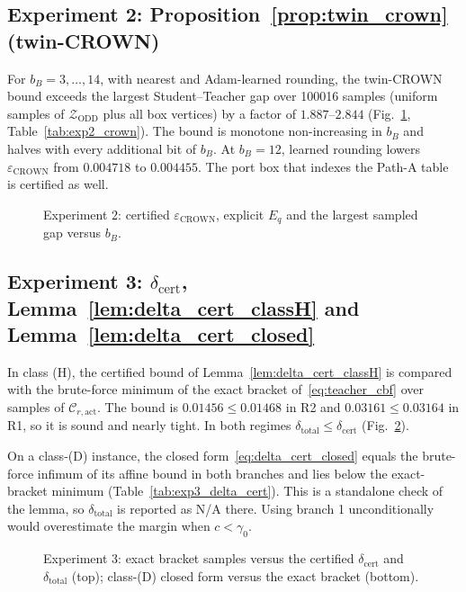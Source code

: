 \subsection{Experiment 2: Proposition~\ref{prop:twin_crown} (twin-CROWN)}
For \(b_B = 3,\dots,14\), with nearest and Adam-learned rounding, the twin-CROWN bound exceeds the
largest Student--Teacher gap over 100016 samples (uniform samples of \(\mathcal Z_{\mathrm{ODD}}\) plus all box
vertices) by a factor of \(1.887\)--\(2.844\) (Fig.~\ref{fig:exp2}, Table~\ref{tab:exp2_crown}).
The bound is monotone non-increasing in \(b_B\) and halves with every additional bit of \(b_B\). At \(b_B = 12\), learned rounding
lowers \(\varepsilon_{\mathrm{CROWN}}\) from \(0.004718\) to \(0.004455\). The port box that indexes the Path-A
table is certified as well.


\begin{figure}[t]\centering{}
\caption{Experiment 2: certified \(\varepsilon_{\mathrm{CROWN}}\), explicit \(E_q\) and the largest sampled gap versus \(b_B\).}\label{fig:exp2}\end{figure}

\subsection{Experiment 3: \(\delta_{\mathrm{cert}}\), Lemma~\ref{lem:delta_cert_classH} and Lemma~\ref{lem:delta_cert_closed}}
In class (H), the certified bound of Lemma~\ref{lem:delta_cert_classH} is compared with the brute-force minimum of the
exact bracket of~\eqref{eq:teacher_cbf} over samples of \(\mathcal C_{r,\mathrm{act}}\). The bound is
\(0.01456 \le 0.01468\) in R2 and \(0.03161 \le 0.03164\) in R1, so it is sound and nearly
tight. In both regimes \(\delta_{\mathrm{total}} \le \delta_{\mathrm{cert}}\) (Fig.~\ref{fig:exp3}).

On a class-(D) instance, the closed form~\eqref{eq:delta_cert_closed} equals the brute-force infimum of its affine bound
in both branches and lies below the exact-bracket minimum (Table~\ref{tab:exp3_delta_cert}). This is a standalone check
of the lemma, so \(\delta_{\mathrm{total}}\) is reported as N/A there. Using branch 1 unconditionally would overestimate
the margin when \(c < \gamma_0\).

\begin{figure}[t]\centering{}
\caption{Experiment 3: exact bracket samples versus the certified \(\delta_{\mathrm{cert}}\) and \(\delta_{\mathrm{total}}\) (top);
class-(D) closed form versus the exact bracket (bottom).}\label{fig:exp3}\end{figure}


